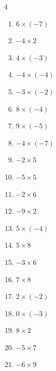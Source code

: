 \begin{multicols}{4}
\begin{enumerate}
  \item $6\times (-7)$
        \phantom{$=-42$}

  \item $-4\times 2$
        \phantom{$=-8$}

  \item $4\times (-3)$
        \phantom{$=-12$}

  \item $-4\times (-4)$
        \phantom{$=16$}

  \item $-3\times (-2)$
        \phantom{$=6$}

  \item $8\times (-4)$
        \phantom{$=-32$}

  \item $9\times (-5)$
        \phantom{$=-45$}

  \item $-4\times (-7)$
        \phantom{$=28$}

  \item $-2\times 5$
        \phantom{$=-10$}

  \item $-5\times 5$
        \phantom{$=-25$}

  \item $-2\times 6$
        \phantom{$=-12$}

  \item $-9\times 2$
        \phantom{$=-18$}

  \item $5\times (-4)$
        \phantom{$=-20$}

  \item $5\times 8$
        \phantom{$=40$}

  \item $-3\times 6$
        \phantom{$=-18$}

  \item $7\times 8$
        \phantom{$=56$}

  \item $2\times (-2)$
        \phantom{$=-4$}

  \item $0\times (-3)$
        \phantom{$=0$}

  \item $8\times 2$
        \phantom{$=16$}

  \item $-5\times 7$
        \phantom{$=-35$}

  \item $-6\times 9$
        \phantom{$=-54$}


\end{enumerate}
\end{multicols}
